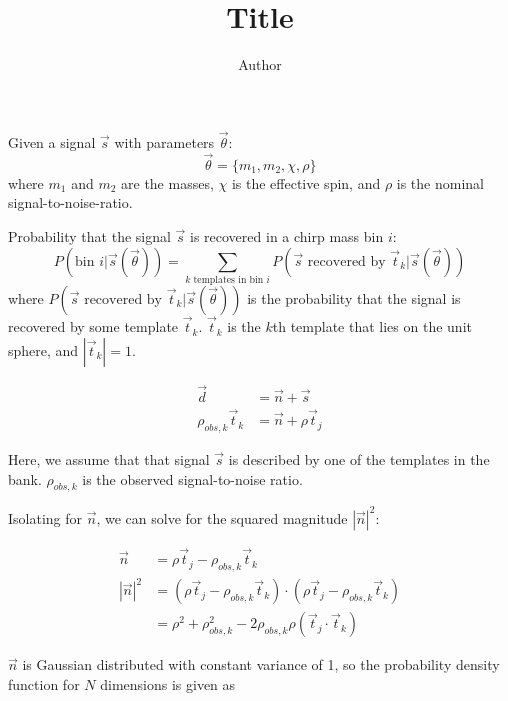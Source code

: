 \documentclass[12pt]{article}
\title{Title}
\author{Author}
\date{}
\newcommand{\ptjtk}{\rho(\vec{t}_j\cdot\vec{t}_k)}
\begin{document}
\maketitle
\tableofcontents

\section{}

Given a signal $\vec{s}$ with parameters $\vec\theta$:
   \begin{equation}
   \vec\theta = \{m_1,m_2,\chi,\rho\}
   \end{equation}
where $m_1$ and $m_2$ are the masses, $\chi$ is the effective spin, and $\rho$ is the nominal signal-to-noise-ratio.

Probability that the signal $\vec{s}$ is recovered in a chirp mass bin $i$:
   \begin{equation}
   P(\text{bin $i$} | \vec{s}(\vec\theta)) = \sum_{\text{$k$ templates in bin $i$}} P(\text{$\vec{s}$ recovered by $\vec{t}_k$}|\vec{s}(\vec\theta))
   \end{equation}
where $P(\text{$\vec{s}$ recovered by $\vec{t}_k$}|\vec{s}(\vec\theta))$ is the probability that the signal is recovered by some template $\vec{t}_k$. $\vec{t}_k$ is the $k$th template that lies on the unit sphere, and $|\vec{t}_k| = 1$.

   \begin{align}
   \vec{d} &= \vec{n} + \vec{s} \\
   \rho_{obs,k}\vec{t}_k &= \vec{n} + \rho\vec{t}_j
   \end{align}

Here, we assume that that signal $\vec{s}$ is described by one of the templates in the bank. $\rho_{obs,k}$ is the observed signal-to-noise ratio.

Isolating for $\vec{n}$, we can solve for the squared magnitude $|\vec{n}|^2$:

   \begin{align}
   \vec{n} &= \rho\vec{t}_j - \rho_{obs,k}\vec{t}_k \\
   |\vec{n}|^2 &= (\rho\vec{t}_j - \rho_{obs,k}\vec{t}_k) \cdot (\rho\vec{t}_j - \rho_{obs,k}\vec{t}_k)\\
               &= \rho^2 + \rho_{obs,k}^2 - 2\rho_{obs,k}\ptjtk
   \label{eqn:n_squaredmagnitude}
   \end{align}
   
$\vec{n}$ is Gaussian distributed with constant variance of 1, so the probability density function for $N$ dimensions is given as
\end{document}
